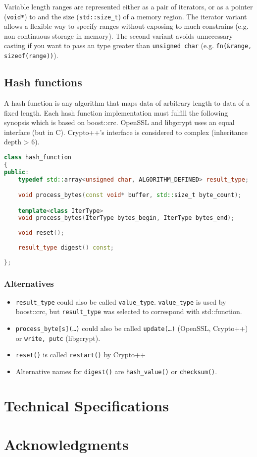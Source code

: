 \documentclass[10pt,letterpaper]{article}
\begin{document}
Variable length ranges are represented either as a pair of iterators, or as a pointer (\texttt{void*}) to and the size (\texttt{std::size\_t}) of a memory region. The iterator variant allows a flexible way to specify ranges without exposing to much constrains (e.g. non continuous storage in memory). The second variant avoids unnecessary casting if you want to pass an type greater than \texttt{unsigned char} (e.g. \texttt{fn(\&range, sizeof(range))}).

\subsection{Hash functions}
A hash function is any algorithm that maps data of arbitrary length to data of a fixed length. %
Each hash function implementation must fulfill the following synopsis which is based on boost::crc. OpenSSL and libgcrypt uses an equal interface (but in C). Crypto++'s interface is considered to complex (inheritance depth > 6).
\begin{lstlisting}[language=C++]
class hash_function
{
public:
	typedef std::array<unsigned char, ALGORITHM_DEFINED> result_type;

	void process_bytes(const void* buffer, std::size_t byte_count);

	template<class IterType>
	void process_bytes(IterType bytes_begin, IterType bytes_end);
	
	void reset();
	
	result_type digest() const;
	
};
\end{lstlisting}
\subsubsection*{Alternatives}
\begin{itemize}
\item \texttt{result\_type} could also be called \texttt{value\_type}. \texttt{value\_type} is used by boost::crc, but \texttt{result\_type} was selected to correspond with std::function.

\item \texttt{process\_byte[s](\dots)} could also be called \texttt{update(\dots)} (OpenSSL, Crypto++) or \texttt{write, putc} (libgcrypt).

\item \texttt{reset()} is called \texttt{restart()} by Crypto++

\item Alternative names for \texttt{digest()} are \texttt{hash\_value()} or \texttt{checksum()}.
\end{itemize}

\section{Technical Specifications}

\section{Acknowledgments}
\end{document}

